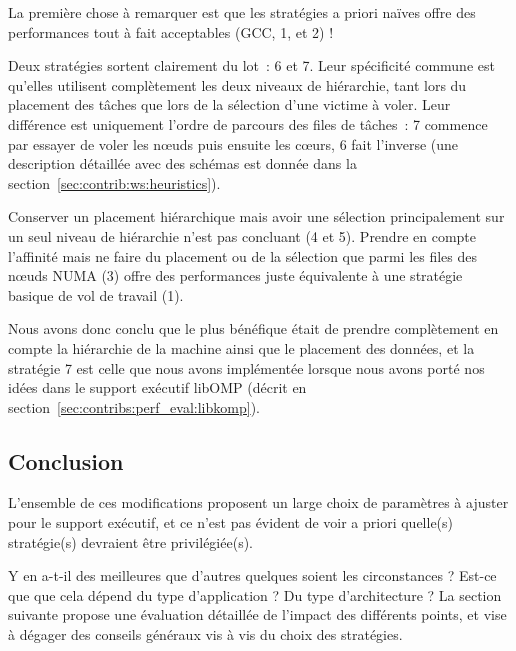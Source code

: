 La première chose à remarquer est que les stratégies a priori naïves offre des performances tout à fait acceptables (GCC, 1, et 2) !

Deux stratégies sortent clairement du lot~: 6 et 7. Leur spécificité commune est qu'elles utilisent complètement les deux niveaux de hiérarchie, tant lors du placement des tâches que lors de la sélection d'une victime à voler.
Leur différence est uniquement l'ordre de parcours des files de tâches~: 7 commence par essayer de voler les nœuds puis ensuite les cœurs, 6 fait l'inverse (une description détaillée avec des schémas est donnée dans la section~\ref{sec:contrib:ws:heuristics}).

Conserver un placement hiérarchique mais avoir une sélection principalement sur un seul niveau de hiérarchie n'est pas concluant (4 et 5).
Prendre en compte l'affinité mais ne faire du placement ou de la sélection que parmi les files des nœuds NUMA (3) offre des performances juste équivalente à une stratégie basique de vol de travail (1).

Nous avons donc conclu que le plus bénéfique était de prendre complètement en compte la hiérarchie de la machine ainsi que le placement des données, et la stratégie 7 est celle que nous avons implémentée lorsque nous avons porté nos idées dans le support exécutif libOMP (décrit en section~\ref{sec:contribs:perf_eval:libkomp}).


\subsection*{Conclusion}

L'ensemble de ces modifications proposent un large choix de paramètres à ajuster pour le support exécutif, et ce n'est pas évident de voir a priori quelle(s) stratégie(s) devraient être privilégiée(s).

Y en a-t-il des meilleures que d'autres quelques soient les circonstances ?
Est-ce que que cela dépend du type d'application ? Du type d'architecture ?
La section suivante propose une évaluation détaillée de l'impact des différents points, et vise à dégager des conseils généraux vis à vis du choix des stratégies.

